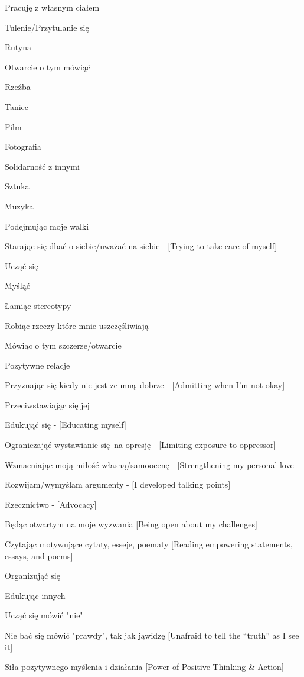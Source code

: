 \begin{multicols}{2}
\begin{checkboxlist}
\item Pracuję z własnym ciałem
\item Tulenie/Przytulanie się
\item Rutyna
\item Otwarcie o tym mówiąć
\item Rzeźba
\item Taniec
\item Film
\item Fotografia
\item Solidarność z innymi
\item Sztuka
\item Muzyka
\item Podejmując moje walki
\item Starając się dbać o siebie/uważać na siebie - [Trying to take care of myself]
\item Ucząć się
\item Myśląć
\item Łamiąc stereotypy
\item Robiąc rzeczy które mnie uszczęśliwiają
\item Mówiąc o tym szczerze/otwarcie
\item Pozytywne relacje
\item Przyznając się kiedy nie jest ze mną dobrze - [Admitting when I’m not okay]
\item Przeciwstawiając się jej
\item Edukująć się - [Educating myself]
\item Ograniczająć wystawianie się na opresję - [Limiting exposure to oppressor]
\item Wzmacniając moją miłość własną/samoocenę - [Strengthening my personal love]
\item Rozwijam/wymyślam argumenty - [I developed talking points]
\item Rzecznictwo - [Advocacy]
\item Będąc otwartym na moje wyzwania [Being open about my challenges]
\item Czytając motywujące cytaty, esseje, poematy [Reading empowering statements, essays, and poems]
\item Organizująć się
\item Edukując innych
\item Ucząć się mówić "nie"
\item Nie bać się mówić "prawdy", tak jak jąwidzę [Unafraid to tell the “truth” as I see it]
\item Siła pozytywnego myślenia i działania [Power of Positive Thinking \& Action]

\end{checkboxlist}
\end{multicols}
